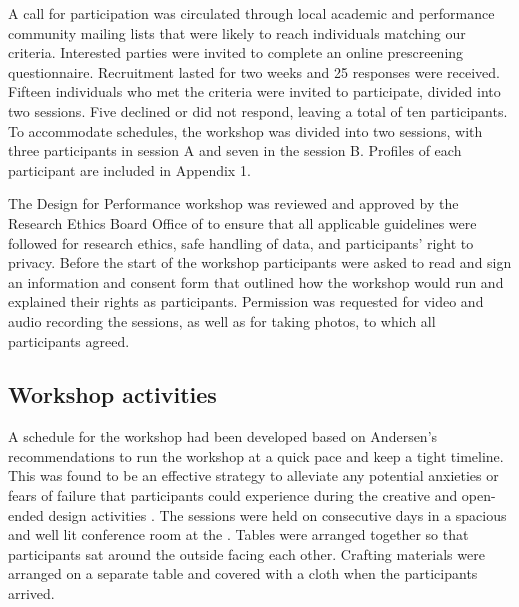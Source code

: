 \documentclass[letterpaper, 12pt]{article}
\begin{document}
A call for participation was circulated through local academic and performance community mailing lists that were likely to reach individuals matching our criteria. 
Interested parties were invited to complete an online prescreening questionnaire. Recruitment lasted for two weeks and 25 responses were received. Fifteen individuals who met the criteria were invited to participate, divided into two sessions. Five declined or did not respond, leaving a total of ten participants. To accommodate schedules, the workshop was divided into two sessions, with three participants in session A and seven in the session B. Profiles of each participant are included in Appendix 1.

The Design for Performance workshop was reviewed and approved by the Research Ethics Board Office of  to ensure that all applicable guidelines were followed for research ethics, safe handling of data, and participants' right to privacy. Before the start of the workshop participants were asked to read and sign an information and consent form that outlined how the workshop would run and explained their rights as participants. Permission was requested for video and audio recording the sessions, as well as for taking photos, to which all participants agreed.

\subsection{Workshop activities}
\label{ch3-sec:workshop-activities}

A schedule for the workshop had been developed based on Andersen's recommendations to run the workshop at a quick pace and keep a tight timeline. This was found to be an effective strategy to alleviate any potential anxieties or fears of failure that participants could experience during the creative and open-ended design activities \citep{Andersen2017}. The sessions were held on consecutive days in a spacious and well lit conference room at the . Tables were arranged together so that participants sat around the outside facing each other. Crafting materials were arranged on a separate table and covered with a cloth when the participants arrived. 
\end{document}
